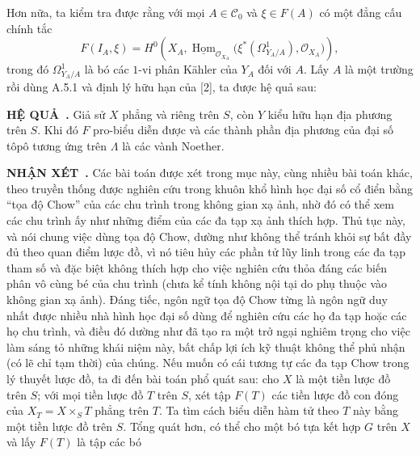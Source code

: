 \documentclass[11pt,twoside,openany]{book}
\numberwithin{equation}{section}
\newcommand{\result}[2]{\par\medskip\noindent\textbf{#1\if\relax\detokenize{#2}\relax\else\ #2\fi.}\quad}
\begin{document}
Hơn nữa, ta kiểm tra được rằng với mọi $A\in\mathcal C_0$ và $\xi\in F(A)$ có
một đẳng cấu chính tắc
\[
  F(I_A,\xi)=H^0\!\left(
    X_A,
    \underline{\operatorname{Hom}}_{\mathcal O_{X_A}}
    \bigl(\xi^*(\Omega^1_{Y_A/A}),\mathcal O_{X_A}\bigr)
  \right),
\]
trong đó $\Omega^1_{Y_A/A}$ là bó các $1$-vi phân Kähler của $Y_A$ đối với
$A$. Lấy $A$ là một trường rồi dùng A.5.1 và định lý hữu hạn của [2], ta được
hệ quả sau:

\result{HỆ QUẢ}{} Giả sử $X$ phẳng và riêng trên $S$, còn $Y$ kiểu hữu hạn địa
phương trên $S$. Khi đó $F$ pro-biểu diễn được và các thành phần địa phương của
đại số tôpô tương ứng trên $\Lambda$ là các vành Noether.

\result{NHẬN XÉT}{} Các bài toán được xét trong mục này, cùng nhiều bài toán
khác, theo truyền thống được nghiên cứu trong khuôn khổ hình học đại số cổ điển
bằng ``tọa độ Chow'' của các chu trình trong không gian xạ ảnh, nhờ đó có thể
xem các chu trình ấy như những điểm của các đa tạp xạ ảnh thích hợp. Thủ tục
này, và nói chung việc dùng tọa độ Chow, dường như không thể tránh khỏi sự bất
đầy đủ theo quan điểm lược đồ, vì nó tiêu hủy các phần tử lũy linh trong các đa
tạp tham số và đặc biệt không thích hợp cho việc nghiên cứu thỏa đáng các biến
phân vô cùng bé của chu trình (chưa kể tính không nội tại do phụ thuộc vào
không gian xạ ảnh). Đáng tiếc, ngôn ngữ tọa độ Chow từng là ngôn ngữ duy nhất
được nhiều nhà hình học đại số dùng để nghiên cứu các họ đa tạp hoặc các họ
chu trình, và điều đó dường như đã tạo ra một trở ngại nghiêm trọng cho việc
làm sáng tỏ những khái niệm này, bất chấp lợi ích kỹ thuật không thể phủ nhận
(có lẽ chỉ tạm thời) của chúng. Nếu muốn có cái tương tự các đa tạp Chow trong
lý thuyết lược đồ, ta đi đến bài toán phổ quát sau: cho $X$ là một tiền lược đồ
trên $S$; với mọi tiền lược đồ $T$ trên $S$, xét tập $F(T)$ các tiền lược đồ
con đóng của $X_T=X\times_ST$ phẳng trên $T$. Ta tìm cách biểu diễn hàm tử theo
$T$ này bằng một tiền lược đồ trên $S$. Tổng quát hơn, có thể cho một bó tựa
kết hợp $G$ trên $X$ và lấy $F(T)$ là tập các bó
\end{document}
